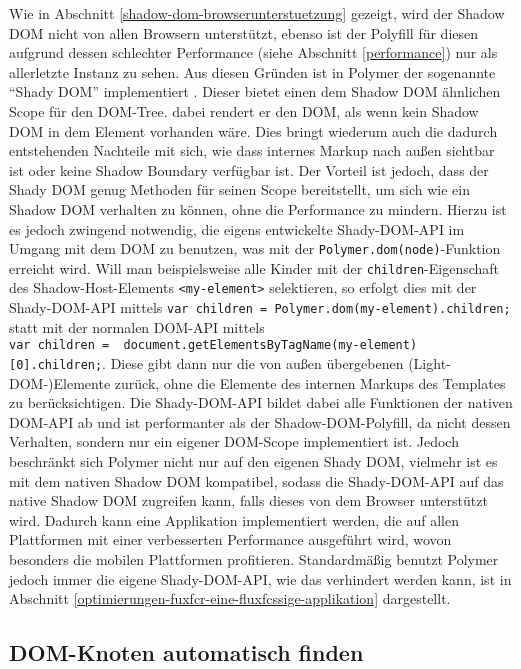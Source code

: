 Wie in Abschnitt \ref{shadow-dom-browserunterstuetzung} gezeigt, wird der Shadow \ac{DOM} nicht von allen Browsern unterstützt, ebenso ist der Polyfill für diesen aufgrund dessen schlechter Performance (siehe Abschnitt \ref{performance}) nur als allerletzte Instanz zu sehen. Aus diesen Gründen ist in Polymer der sogenannte ``Shady \ac{DOM}'' implementiert \cite{citeulike:13886251}. Dieser bietet einen dem Shadow \ac{DOM} ähnlichen Scope für den \ac{DOM}-Tree. dabei rendert er den \ac{DOM}, als wenn kein Shadow \ac{DOM} in dem Element vorhanden wäre. Dies bringt wiederum auch die dadurch entstehenden Nachteile mit sich, wie dass internes Markup nach außen sichtbar ist oder keine Shadow Boundary verfügbar ist. Der Vorteil ist jedoch, dass der Shady \ac{DOM} genug Methoden für seinen Scope bereitstellt, um sich wie ein Shadow \ac{DOM} verhalten zu können, ohne die Performance zu mindern. Hierzu ist es jedoch zwingend notwendig, die eigens entwickelte Shady-\ac{DOM}-\ac{API} im Umgang mit dem \ac{DOM} zu benutzen, was mit der \texttt{Polymer.dom(node)}-Funktion erreicht wird. Will man beispielsweise alle Kinder mit der \texttt{children}-Eigenschaft des Shadow-Host-Elements \texttt{\textless{}my-element\textgreater{}} selektieren, so erfolgt dies mit der Shady-\ac{DOM}-\ac{API} mittels \texttt{var\ children\ =\ Polymer.dom(my-element).children;} statt mit der normalen \ac{DOM}-\ac{API} mittels \texttt{var\ children\ =\ \ document.getElementsByTagName(\dq my-element\dq){[}0{]}.children;}. Diese gibt dann nur die von außen übergebenen (Light-\ac{DOM}-)Elemente zurück, ohne die Elemente des internen Markups des Templates zu berücksichtigen. Die Shady-\ac{DOM}-\ac{API} bildet dabei alle Funktionen der nativen \ac{DOM}-\ac{API} ab und ist performanter als der Shadow-\ac{DOM}-Polyfill, da nicht dessen Verhalten, sondern nur ein eigener \ac{DOM}-Scope implementiert ist. Jedoch beschränkt sich Polymer nicht nur auf den eigenen Shady \ac{DOM}, vielmehr ist es mit dem nativen Shadow \ac{DOM} kompatibel, sodass die Shady-\ac{DOM}-\ac{API} auf das native Shadow \ac{DOM} zugreifen kann, falls dieses von dem Browser unterstützt wird. Dadurch kann eine Applikation implementiert werden, die auf allen Plattformen mit einer verbesserten Performance ausgeführt wird, wovon besonders die mobilen Plattformen profitieren. Standardmäßig benutzt Polymer jedoch immer die eigene Shady-\ac{DOM}-\ac{API}, wie das verhindert werden kann, ist in Abschnitt \ref{optimierungen-fuxfcr-eine-fluxfcssige-applikation} dargestellt.


\subsection{DOM-Knoten automatisch finden}\label{dom-knoten-automatisch-finden}


